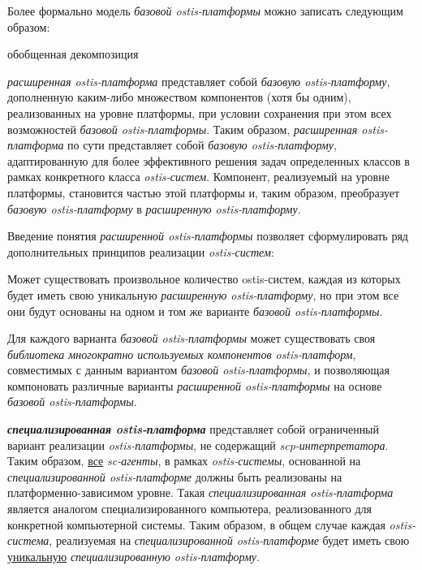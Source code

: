 Более формально модель \textit{базовой ostis-платформы} можно записать следующим образом:

\begin{SCn}
\begin{scnrelfromset}{обобщенная декомпозиция}
	\begin{scnindent}
	\end{scnindent}
\end{scnrelfromset}
\end{SCn}

\textit{расширенная ostis-платформа} представляет собой \textit{базовую ostis-платформу}, дополненную каким-либо множеством компонентов (хотя бы одним), реализованных на уровне платформы, при условии сохранения при этом всех возможностей \textit{базовой ostis-платформы}. Таким образом, \textit{расширенная ostis-платформа} по сути представляет собой \textit{базовую ostis-платформу}, адаптированную для более эффективного решения задач определенных классов в рамках конкретного класса \textit{ostis-систем}. Компонент, реализуемый на уровне платформы, становится частью этой платформы и, таким образом,  преобразует \textit{базовую ostis-платформу} в \textit{расширенную ostis-платформу}. 

Введение понятия \textit{расширенной ostis-платформы} позволяет сформулировать ряд дополнительных принципов реализации \textit{ostis-систем}:
\begin{textitemize}
	\item Может существовать произвольное количество ostis-систем, каждая из которых будет иметь свою уникальную \textit{расширенную ostis-платформу}, но при этом все они будут основаны на одном и том же варианте \textit{базовой ostis-платформы}.
	\item Для каждого варианта \textit{базовой ostis-платформы} может существовать своя \textit{библиотека многократно используемых компонентов ostis-платформ}, совместимых с данным вариантом \textit{базовой ostis-платформы}, и позволяющая компоновать различные варианты \textit{расширенной ostis-платформы} на основе \textit{базовой ostis-платформы}.
\end{textitemize} 

\textbf{\textit{специализированная ostis-платформа}} представляет собой ограниченный вариант реализации \textit{ostis-платформы}, не содержащий \textit{scp-интерпретатора}. Таким образом, \uline{все} \textit{sc-агенты}, в рамках \textit{ostis-системы}, основанной на \textit{специализированной ostis-платформе} должны быть реализованы на платформенно-зависимом уровне. Такая  \textit{специализированная ostis-платформа} является аналогом специализированного компьютера, реализованного для конкретной компьютерной системы. Таким образом, в общем случае каждая \textit{ostis-система}, реализуемая на \textit{специализированной ostis-платформе} будет иметь свою \uline{уникальную} \textit{специализированную ostis-платформу}.

